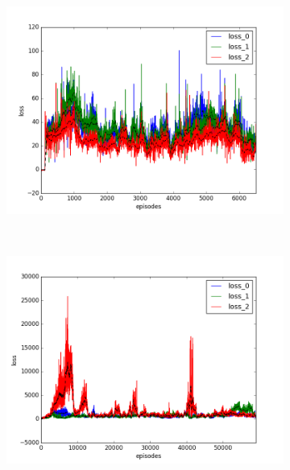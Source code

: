 \begin{figure}[t]
  \vspace{\graphspacing}
  \begin{subfigure}[t]{\figscale\linewidth}
    \hspace*{-2.75cm}
    \includegraphics[width=1.5\textwidth]
    {../results/dqn_1vs2/loss.png}
    \label{fig:dqn-1vs2-loss}
  \end{subfigure}
  ~
  \begin{subfigure}[t]{\figscale\linewidth}
    \hspace*{-1.4cm}
    \includegraphics[width=1.5\textwidth]
    {../results/ddpg_1vs2/loss.png}
    \label{fig:ddpg-1vs2-loss}
  \end{subfigure}
  ~
  \begin{subfigure}[t]{\figscale\linewidth}

\end{subfigure}
\end{figure}
